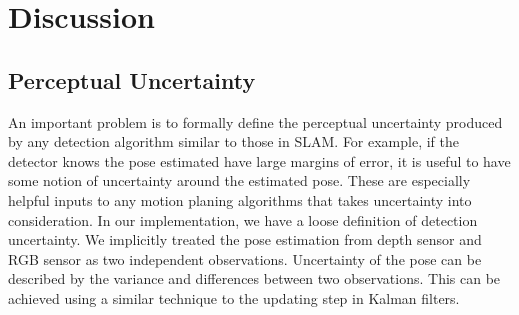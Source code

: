 \section{Discussion}
\label{sec:discussion}
\subsection{Perceptual Uncertainty}
An important problem is to formally define the perceptual uncertainty produced by any detection algorithm similar to those in SLAM. For example, if the detector knows the pose estimated have large margins of error, it is useful to have some notion of uncertainty around the estimated pose. These are especially helpful inputs to any motion planing algorithms that takes uncertainty into consideration. In our implementation, we have a loose definition of detection uncertainty. We implicitly treated the pose estimation from depth sensor and RGB sensor as two independent observations. Uncertainty of the pose can be described by the variance and differences between two observations. This can be achieved using a similar technique to the updating step in Kalman filters.

